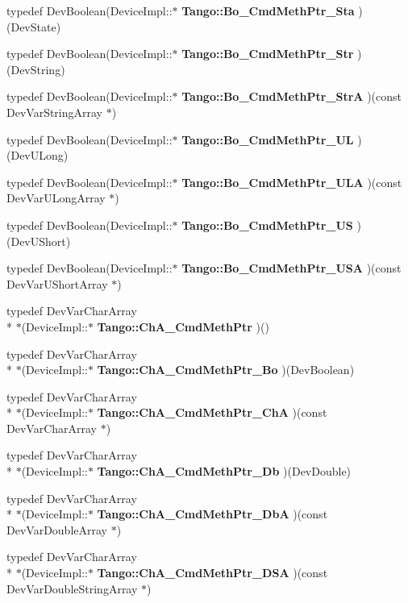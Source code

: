 \begin{DoxyCompactItemize}
\item 
typedef Dev\-Boolean(Device\-Impl\-::$\ast$ {\bf Tango\-::\-Bo\-\_\-\-Cmd\-Meth\-Ptr\-\_\-\-Sta} )(Dev\-State)
\item 
typedef Dev\-Boolean(Device\-Impl\-::$\ast$ {\bf Tango\-::\-Bo\-\_\-\-Cmd\-Meth\-Ptr\-\_\-\-Str} )(Dev\-String)
\item 
typedef Dev\-Boolean(Device\-Impl\-::$\ast$ {\bf Tango\-::\-Bo\-\_\-\-Cmd\-Meth\-Ptr\-\_\-\-Str\-A} )(const Dev\-Var\-String\-Array $\ast$)
\item 
typedef Dev\-Boolean(Device\-Impl\-::$\ast$ {\bf Tango\-::\-Bo\-\_\-\-Cmd\-Meth\-Ptr\-\_\-\-U\-L} )(Dev\-U\-Long)
\item 
typedef Dev\-Boolean(Device\-Impl\-::$\ast$ {\bf Tango\-::\-Bo\-\_\-\-Cmd\-Meth\-Ptr\-\_\-\-U\-L\-A} )(const Dev\-Var\-U\-Long\-Array $\ast$)
\item 
typedef Dev\-Boolean(Device\-Impl\-::$\ast$ {\bf Tango\-::\-Bo\-\_\-\-Cmd\-Meth\-Ptr\-\_\-\-U\-S} )(Dev\-U\-Short)
\item 
typedef Dev\-Boolean(Device\-Impl\-::$\ast$ {\bf Tango\-::\-Bo\-\_\-\-Cmd\-Meth\-Ptr\-\_\-\-U\-S\-A} )(const Dev\-Var\-U\-Short\-Array $\ast$)
\item 
typedef Dev\-Var\-Char\-Array \\*
$\ast$(Device\-Impl\-::$\ast$ {\bf Tango\-::\-Ch\-A\-\_\-\-Cmd\-Meth\-Ptr} )()
\item 
typedef Dev\-Var\-Char\-Array \\*
$\ast$(Device\-Impl\-::$\ast$ {\bf Tango\-::\-Ch\-A\-\_\-\-Cmd\-Meth\-Ptr\-\_\-\-Bo} )(Dev\-Boolean)
\item 
typedef Dev\-Var\-Char\-Array \\*
$\ast$(Device\-Impl\-::$\ast$ {\bf Tango\-::\-Ch\-A\-\_\-\-Cmd\-Meth\-Ptr\-\_\-\-Ch\-A} )(const Dev\-Var\-Char\-Array $\ast$)
\item 
typedef Dev\-Var\-Char\-Array \\*
$\ast$(Device\-Impl\-::$\ast$ {\bf Tango\-::\-Ch\-A\-\_\-\-Cmd\-Meth\-Ptr\-\_\-\-Db} )(Dev\-Double)
\item 
typedef Dev\-Var\-Char\-Array \\*
$\ast$(Device\-Impl\-::$\ast$ {\bf Tango\-::\-Ch\-A\-\_\-\-Cmd\-Meth\-Ptr\-\_\-\-Db\-A} )(const Dev\-Var\-Double\-Array $\ast$)
\item 
typedef Dev\-Var\-Char\-Array \\*
$\ast$(Device\-Impl\-::$\ast$ {\bf Tango\-::\-Ch\-A\-\_\-\-Cmd\-Meth\-Ptr\-\_\-\-D\-S\-A} )(const Dev\-Var\-Double\-String\-Array $\ast$)

\end{DoxyCompactItemize}
